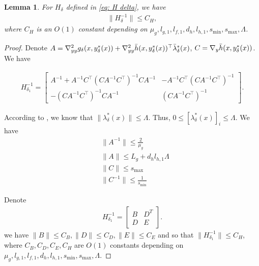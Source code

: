 \documentclass{article}
\theoremstyle{plain}
\newtheorem{lemma}[theorem]{Lemma}
\theoremstyle{definition}
\theoremstyle{remark}
\begin{document}
\begin{lemma}\label{lemma: CH}
For $H_{\delta}$ defined in \eqref{eq: H delta}, we have
    \begin{align*}
        \|H_{\delta}^{-1}\|\leq C_H,
    \end{align*}
where $C_H$ is an $O(1)$ constant depending on $\mu_g, l_{g,1}, l_{f,1}, d_h, l_{h,1}, s_{\min}, s_{\max}, \Lambda$.
\end{lemma}
\begin{proof}

Denote $A=\nabla^2_{yy} g_\delta(x, y^*_\delta(x))+\nabla^2_{yy}\Bar{h}(x,y^*_\delta(x))^\top\Bar{\lambda}^*_\delta(x)$, $C=\nabla_y\Bar{h}(x,y^*_\delta(x))$. We have

    \begin{align*}
        H_{\delta_1}^{-1} = \begin{bmatrix}
        A^{-1} + A^{-1} C^\top (C A^{-1} C^\top)^{-1} C A^{-1} & -A^{-1} C^\top (C A^{-1} C^\top)^{-1} \\
        -(C A^{-1} C^\top)^{-1} C A^{-1} & (C A^{-1} C^\top)^{-1}
        \end{bmatrix}.
    \end{align*}


According to , we know that $\|\lambda^*_\delta(x)\|\leq \Lambda$. Thus, $0\leq [\lambda^*_\delta(x)]_i\leq \Lambda$. We have
\begin{align*}
    &\|A^{-1}\|\leq \frac{2}{\mu_g}\\
    &\|A\|\leq L_g+d_h l_{h,1} \Lambda\\
    &\|C\|\leq s_{\max}\\
    &\|C^{-1}\|\leq \frac{1}{s_{\min}}
\end{align*}

Denote 
\begin{align*}
    H_{\delta_1}^{-1} = \begin{bmatrix}
        B & D^T\\
        D & E
        \end{bmatrix}.
\end{align*}
we have $\|B\|\leq C_B, \|D\|\leq C_D, \|E\|\leq C_E$ and so that $\|H_{\delta_1}^{-1}\|\leq C_H$, where $C_B, C_D, C_E, C_H$ are $O(1)$ constants depending on $\mu_g, l_{g,1}, l_{f,1}, d_h, l_{h,1}, s_{\min}, s_{\max}, \Lambda$.

\end{proof}
\end{document}
